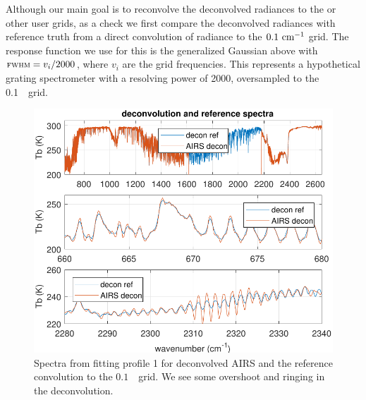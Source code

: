 \documentclass[journal]{IEEEtran}
\begin{document}
Although our main goal is to reconvolve the deconvolved {\airs}
radiances to the {\cris} or other user grids, as a check we first
compare the deconvolved radiances with reference truth from a direct
convolution of {\kcarta} radiance to the $0.1~\mbox{cm$^{-1}$}$ grid.  The
response function we use for this is the generalized Gaussian above
with ${\mbox{\small\textsc{fwhm}}} = v_i / 2000$, where $v_i$ are the grid frequencies.
This represents a hypothetical grating spectrometer with a resolving
power of 2000, oversampled to the 0.1~\wn\ grid.



\begin{figure} %
  \centering
  \includegraphics[width=\linewidth]{figures/airs_decon_spec.pdf}
  \caption{Spectra from fitting profile 1 for deconvolved AIRS
    and the reference convolution to the $0.1$~\wn\ grid.  We see
    some overshoot and ringing in the deconvolution.}
  \label{dspec}
\end{figure}
\end{document}
